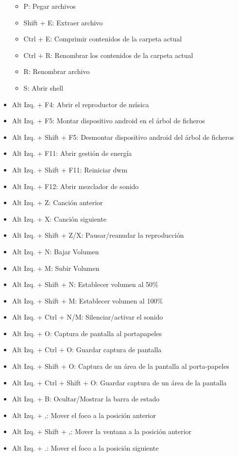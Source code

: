 \documentclass[12pt]{article}
\begin{document}
\begin{itemize}
\begin{itemize}
\item P: Pegar archivos
\item Shift + E: Extraer archivo
\item Ctrl + E: Comprimir contenidos de la carpeta actual
\item Ctrl + R: Renombrar los contenidos de la carpeta actual
\item R: Renombrar archivo
\item S: Abrir shell
\end{itemize}
\item Alt Izq. + F4: Abrir el reproductor de música
\item Alt Izq. + F5: Montar dispositivo android en el árbol de ficheros
\item Alt Izq. + Shift + F5: Desmontar dispositivo android del árbol de ficheros
\item Alt Izq. + F11: Abrir gestión de energía
\item Alt Izq. + Shift + F11: Reiniciar dwm
\item Alt Izq. + F12: Abrir mezclador de sonido
\item Alt Izq. + Z: Canción anterior
\item Alt Izq. + X: Canción siguiente
\item Alt Izq. + Shift + Z/X: Pausar/reanudar la reproducción
\item Alt Izq. + N: Bajar Volumen
\item Alt Izq. + M: Subir Volumen
\item Alt Izq. + Shift + N: Establecer volumen al 50\%
\item Alt Izq. + Shift + M: Establecer volumen al 100\%
\item Alt Izq. + Ctrl + N/M: Silenciar/activar el sonido
\item Alt Izq. + O: Captura de pantalla al portapapeles
\item Alt Izq. + Ctrl + O: Guardar captura de pantalla
\item Alt Izq. + Shift + O: Captura de un área de la pantalla al porta-papeles
\item Alt Izq. + Ctrl + Shift + O: Guardar captura de un área de la pantalla
\item Alt Izq. + B: Ocultar/Mostrar la barra de estado
\item Alt Izq. + ,: Mover el foco a la posición anterior
\item Alt Izq. + Shift + ,: Mover la ventana a la posición anterior
\item Alt Izq. + .: Mover el foco a la posición siguiente

\end{itemize}
\end{document}
